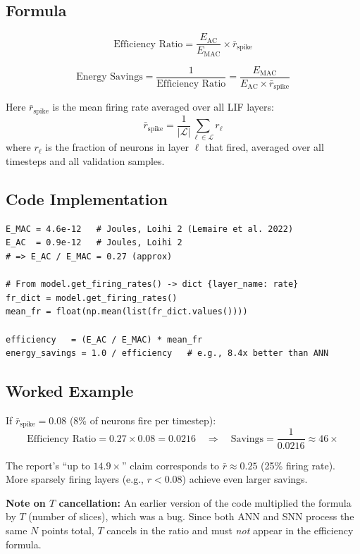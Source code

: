 \documentclass[11pt,a4paper]{article}
\begin{document}
\subsection{Formula}

\[
  \text{Efficiency Ratio} = \frac{E_{\text{AC}}}{E_{\text{MAC}}}
                           \times \bar{r}_{\text{spike}}
\]

\[
  \text{Energy Savings} = \frac{1}{\text{Efficiency Ratio}}
                        = \frac{E_{\text{MAC}}}{E_{\text{AC}} \times \bar{r}_{\text{spike}}}
\]

Here $\bar{r}_{\text{spike}}$ is the mean firing rate averaged over all LIF layers:
\[
  \bar{r}_{\text{spike}} = \frac{1}{|\mathcal{L}|} \sum_{\ell \in \mathcal{L}} r_\ell
\]
where $r_\ell$ is the fraction of neurons in layer $\ell$ that fired, averaged
over all timesteps and all validation samples.

\subsection{Code Implementation}

\begin{lstlisting}
E_MAC = 4.6e-12   # Joules, Loihi 2 (Lemaire et al. 2022)
E_AC  = 0.9e-12   # Joules, Loihi 2
# => E_AC / E_MAC = 0.27 (approx)

# From model.get_firing_rates() -> dict {layer_name: rate}
fr_dict = model.get_firing_rates()
mean_fr = float(np.mean(list(fr_dict.values())))

efficiency   = (E_AC / E_MAC) * mean_fr
energy_savings = 1.0 / efficiency   # e.g., 8.4x better than ANN
\end{lstlisting}

\subsection{Worked Example}

If $\bar{r}_{\text{spike}} = 0.08$ (8\% of neurons fire per timestep):
\[
  \text{Efficiency Ratio} = 0.27 \times 0.08 = 0.0216
  \quad\Rightarrow\quad
  \text{Savings} = \frac{1}{0.0216} \approx 46\times
\]

The report's ``up to $14.9\times$'' claim corresponds to $\bar{r} \approx 0.25$
(25\% firing rate). More sparsely firing layers (e.g., $r < 0.08$) achieve even
larger savings.

\textbf{Note on $T$ cancellation:} An earlier version of the code multiplied
the formula by $T$ (number of slices), which was a bug. Since both ANN and SNN
process the same $N$ points total, $T$ cancels in the ratio and must \emph{not}
appear in the efficiency formula.
\end{document}

